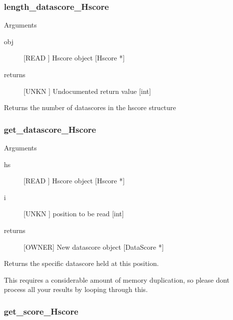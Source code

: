 \subsubsection{length_datascore_Hscore}

Arguments
\begin{description}
\item[obj] [READ ] Hscore object [Hscore *]
\item[returns] [UNKN ] Undocumented return value [int]
\end{description}
Returns the number of datascores in the hscore
structure


\subsubsection{get_datascore_Hscore}

Arguments
\begin{description}
\item[hs] [READ ] Hscore object [Hscore *]
\item[i] [UNKN ] position to be read [int]
\item[returns] [OWNER] New datascore object [DataScore *]
\end{description}
Returns the specific datascore held at this
position.


This requires a considerable amount of memory
duplication, so please dont process all your
results by looping through this.


\subsubsection{get_score_Hscore}

